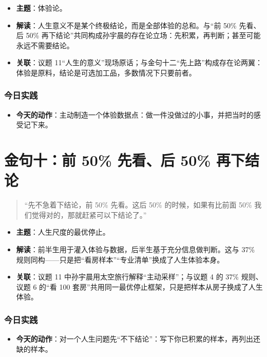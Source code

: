 \begin{itemize}
\tightlist
\item
  \textbf{主题}：体验论。
\item
  \textbf{解读}：人生意义不是某个终极结论，而是全部体验的总和。与``前
  50\% 先看、后 50\%
  再下结论''共同构成孙宇晨的存在论立场：先积累，再判断；甚至可能永远不需要结论。
\item
  \textbf{关联}：议题
  11``人生的意义''现场原话；与金句十二``先上路''构成存在论两翼：体验是原料，结论是可选加工品，多数情况下只要前者。
\end{itemize}

\subsubsection{今日实践}

\begin{itemize}
\tightlist
\item
  \textbf{今天的动作}：主动制造一个体验数据点：做一件没做过的小事，并把当时的感受记下来。
\end{itemize}

\section{金句十：前 50\% 先看、后 50\%
再下结论}

\begin{quote}
``先不急着下结论，前 50\% 先看。这后 50\% 的时候，如果有比前面 50\%
我们觉得对的，那就赶紧可以下结论了。''
\end{quote}

\begin{itemize}
\tightlist
\item
  \textbf{主题}：人生尺度的最优停止。
\item
  \textbf{解读}：前半生用于灌入体验与数据，后半生基于充分信息做判断。这与
  37\% 规则同构------只是把``看房样本''``专业清单''换成了人生体验本身。
\item
  \textbf{关联}：议题 11 中孙宇晨用太空旅行解释``主动采样''；与议题 4 的
  37\% 规则、议题 6 的``看 100
  套房''共用同一最优停止框架，只是把样本从房子换成了人生体验。
\end{itemize}

\subsubsection{今日实践}

\begin{itemize}
\tightlist
\item
  \textbf{今天的动作}：对一个人生问题先``不下结论''：写下你已积累的样本，再列出还缺的样本。
\end{itemize}

